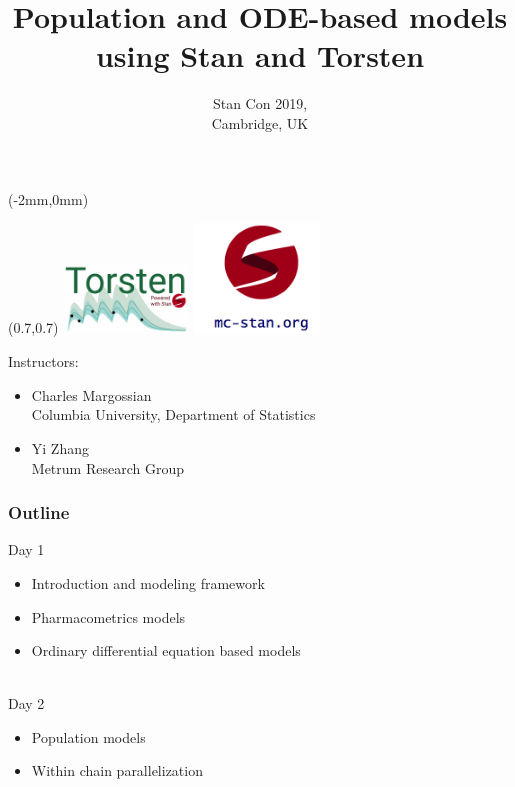 \documentclass[xcolor=table]{beamer}
\title[Stan workshop 2019]{\textcolor{MRGGreen}{Population and ODE-based models \\
 using Stan and Torsten}}
\date{Stan Con 2019, \\ Cambridge, UK}
\begin{document}
 

\begin{frame}
  \begin{textblock*}{80mm}(-2mm,0mm)
  \end{textblock*}
  \begin{textblock*}{80mm}(0.7\textwidth,0.7\textheight)
    \includegraphics[width=0.25\textwidth]{../torstenLogo.png}
    \includegraphics[width=0.25\textwidth]{../stanLogo.png}
  \end{textblock*}
  \titlepage
\end{frame}

\begin{frame}
  Instructors:
  \begin{itemize}
    \item {Charles Margossian \\ Columbia University, Department of Statistics}
    \item {Yi Zhang \\ Metrum Research Group}
  \end{itemize}
  
\end{frame}

\begin{frame}
  \frametitle{Outline}

   Day 1
   \begin{itemize}
     \item Introduction and modeling framework
     \item Pharmacometrics models
     \item Ordinary differential equation based models
   \end{itemize}
   
   \ \\
   Day 2
   \begin{itemize}
     \item Population models
     \item Within chain parallelization
   \end{itemize}
\end{frame}
\end{document}
